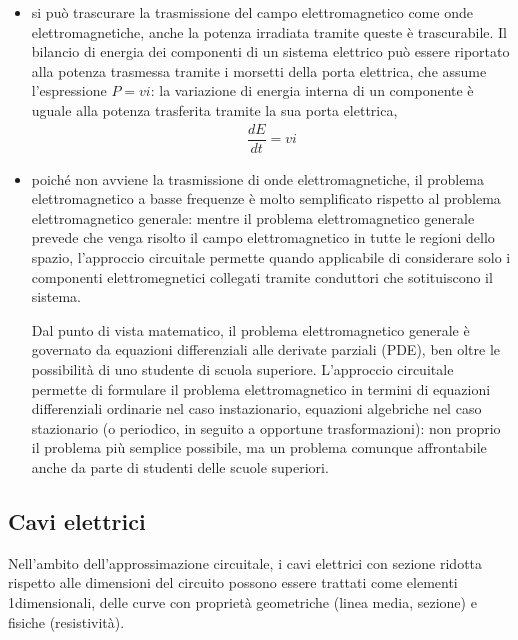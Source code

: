 \documentclass[letterpaper,10pt,italian]{jupyterBook}
\begin{document}
\begin{itemize}
\item {} 
\sphinxAtStartPar
si può trascurare la trasmissione del campo elettromagnetico come onde elettromagnetiche, anche la potenza irradiata tramite queste è trascurabile. Il bilancio di energia dei componenti di un sistema elettrico può essere riportato alla potenza trasmessa tramite i morsetti della porta elettrica, che assume l’espressione \(P = v i\): la variazione di energia interna di un componente è uguale alla potenza trasferita tramite la sua porta elettrica,
\begin{equation*}
\begin{split}\dfrac{d E}{dt} = v i\end{split}
\end{equation*}
\item {} 
\sphinxAtStartPar
poiché non avviene la trasmissione di onde elettromagnetiche, il problema elettromagnetico a basse frequenze è molto semplificato rispetto al problema elettromagnetico generale: mentre il problema elettromagnetico generale prevede che venga risolto il campo elettromagnetico in tutte le regioni dello spazio, l’approccio circuitale permette \sphinxhyphen{} quando applicabile \sphinxhyphen{} di considerare solo i componenti elettromegnetici collegati tramite conduttori che sotituiscono il sistema.%
\begin{footnote}[1]\sphinxAtStartFootnote
Dal punto di vista matematico, il problema elettromagnetico generale è governato da equazioni differenziali alle derivate parziali (PDE), ben oltre le possibilità di uno studente di scuola superiore. L’approccio circuitale permette di formulare il problema elettromagnetico in termini di equazioni differenziali ordinarie nel caso instazionario, equazioni algebriche nel caso stazionario (o periodico, in seguito a opportune trasformazioni): non proprio il problema più semplice possibile, ma un problema comunque affrontabile anche da parte di studenti delle scuole superiori.
%
\end{footnote}

\end{itemize}


\subsection{Cavi elettrici}
\label{\detokenize{ch/electromagnetism/circuits-electric:cavi-elettrici}}\label{\detokenize{ch/electromagnetism/circuits-electric:physics-hs-electromagnetism-circuits-electric-electric-cable}}
\sphinxAtStartPar
Nell’ambito dell’approssimazione circuitale, i cavi elettrici con sezione ridotta rispetto alle dimensioni del circuito possono essere trattati come elementi 1\sphinxhyphen{}dimensionali, delle curve con proprietà geometriche (linea media, sezione) e fisiche (resistività).
\end{document}
